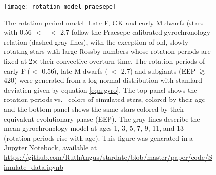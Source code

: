 \begin{figure}
  \caption{
The rotation period model.
    Late F, GK and early M dwarfs (stars with 0.56 $<$ \gcolor\ $<$ 2.7 follow
    the Praesepe-calibrated gyrochronology relation (dashed gray lines), with
    the exception of old, slowly
    rotating stars with large Rossby numbers whose rotation periods are fixed
    at 2$\times$ their convective overturn time.
    The rotation periods of early F (\gcolor $<$ 0.56), late M dwarfs (\gcolor
    $<$ 2.7) and subgiants (EEP $\gtrsim$ 420) were generated
    from a log-normal distribution with standard deviation given by equation
    \ref{eqn:gyro}.
The top panel shows the rotation periods vs. \gcolor\ colors of simulated stars,
    colored by their age and the bottom panel shows the same stars colored
    by their equivalent evolutionary phase (EEP).
    The gray lines describe the mean gyrochronology model at ages 1,
    3, 5, 7, 9, 11, and 13 (rotation periods rise with age).
    This figure was generated in a Jupyter Notebook, available at
    \url{https://github.com/RuthAngus/stardate/blob/master/paper/code/Simulate_data.ipynb}
}
  \centering
    \texttt{[image: rotation\_model\_praesepe]}
\label{fig:rotation_model}
\end{figure}

